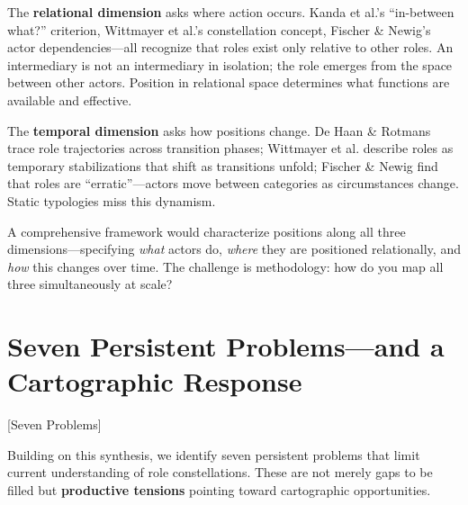 \documentclass[../main.tex]{subfiles}
\begin{document}
The \textbf{relational dimension} asks where action occurs. Kanda et al.'s ``in-between what?'' criterion, Wittmayer et al.'s constellation concept, Fischer \& Newig's actor dependencies---all recognize that roles exist only relative to other roles. An intermediary is not an intermediary in isolation; the role emerges from the space between other actors. Position in relational space determines what functions are available and effective.

The \textbf{temporal dimension} asks how positions change. De Haan \& Rotmans trace role trajectories across transition phases; Wittmayer et al. describe roles as temporary stabilizations that shift as transitions unfold; Fischer \& Newig find that roles are ``erratic''---actors move between categories as circumstances change. Static typologies miss this dynamism.

A comprehensive framework would characterize positions along all three dimensions---specifying \textit{what} actors do, \textit{where} they are positioned relationally, and \textit{how} this changes over time. The challenge is methodology: how do you map all three simultaneously at scale?


\section{Seven Persistent Problems---and a Cartographic Response}[Seven Problems]

Building on this synthesis, we identify seven persistent problems that limit current understanding of role constellations. These are not merely gaps to be filled but \textbf{productive tensions} pointing toward cartographic opportunities.
\end{document}
